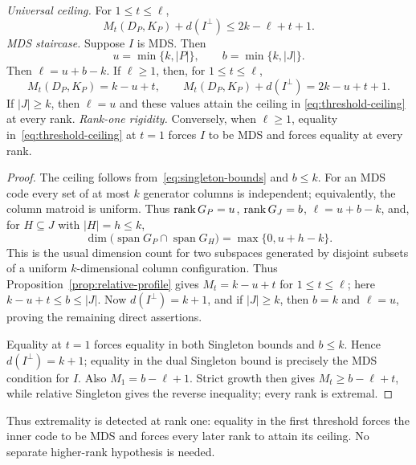 \begin{theorem}
\label{thm:mds-thresholds}
%
\emph{Universal ceiling.}
For $1\leq t\leq\ell$,
\begin{equation}
 M_t(D_P,K_P)+d(I^\perp)
 \leq2k-\ell+t+1.
 \label{eq:threshold-ceiling}
\end{equation}
\emph{MDS staircase.}
Suppose $I$ is MDS.  Then
\[
 u=\min\{k,|P|\},\qquad b=\min\{k,|J|\}.
\]
Then $\ell=u+b-k$.  If $\ell\geq1$, then, for $1\leq t\leq\ell$,
\begin{equation}
 M_t(D_P,K_P)=k-u+t,
 \qquad
 M_t(D_P,K_P)+d(I^\perp)=2k-u+t+1.
 \label{eq:mds-staircase}
\end{equation}
If $|J|\geq k$, then $\ell=u$ and these values attain the ceiling in
\eqref{eq:threshold-ceiling} at every rank.
\emph{Rank-one rigidity.}
Conversely, when $\ell\geq1$, equality in~\eqref{eq:threshold-ceiling} at
$t=1$ forces $I$ to be MDS and forces equality at every rank.
\end{theorem}

\begin{proof}
The ceiling follows from~\eqref{eq:singleton-bounds} and $b\leq k$.  For an
MDS code every set of at most $k$ generator columns is independent; equivalently,
the column matroid is uniform.  Thus $\operatorname{rank} G_P=u$, $\operatorname{rank} G_J=b$,
$\ell=u+b-k$, and, for $H\subseteq J$ with $|H|=h\leq k$,
\[
 \dim\bigl(\operatorname{span}G_P\cap\operatorname{span}G_H\bigr)
 =\max\{0,u+h-k\}.
\]
This is the usual dimension count for two subspaces generated by disjoint
subsets of a uniform $k$-dimensional column configuration.
Thus Proposition~\ref{prop:relative-profile} gives $M_t=k-u+t$ for
$1\leq t\leq\ell$; here $k-u+t\leq b\leq|J|$.  Now
$d(I^\perp)=k+1$, and if $|J|\geq k$, then $b=k$ and $\ell=u$, proving the
remaining direct assertions.

Equality at $t=1$ forces equality in both Singleton bounds and $b\leq k$.
Hence $d(I^\perp)=k+1$; equality in the dual Singleton bound is precisely the
MDS condition for $I$.  Also $M_1=b-\ell+1$.  Strict growth
then gives $M_t\geq b-\ell+t$, while relative Singleton gives the reverse
inequality; every rank is extremal.
%
%
%
\end{proof}

Thus extremality is detected at rank one: equality in the first threshold
forces the inner code to be MDS and forces every later rank to attain its
ceiling.  No separate higher-rank hypothesis is needed.


